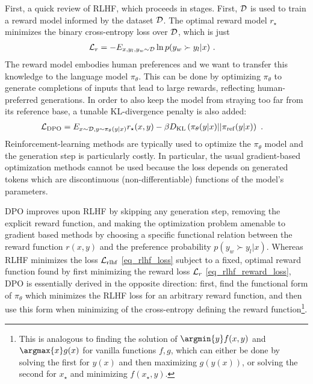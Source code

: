 First, a quick review of RLHF, which proceeds in stages. First, $ \mathcal{D} $ is used to train a reward
model informed by the dataset $ \mathcal{D} $. The optimal reward model $ r_{ \star } $ minimizes the
binary cross-entropy loss over $ \mathcal{D} $, which is just
\begin{align}
  \mathcal{L} _{ r }   &= -E _{ x, y _{ l }, y _{ w } \sim \mathcal{D} } \ln p(y _{ w } \succ y _{ l }| x ) \ . \label{eq_rlhf_reward_loss}
\end{align}
 The reward model embodies human preferences and we want to
transfer this knowledge to the language model $ \pi _{ \theta } $. This can be done by optimizing $
\pi _{ \theta  } $ to generate completions of inputs that lead to large rewards, reflecting
human-preferred generations. In order to also keep the model from straying too far from its reference base, a tunable
KL-divergence penalty is also added:
\begin{align}
    \mathcal{L} _{ {\rm DPO} }  &= E _{x \sim \mathcal{D}, y \sim \pi _{ \theta  }(y|x) } r _{ \star } (x, y)
    - \beta D _{ {\rm KL} } \left ( \pi  _{ \theta  }(y|x)|| \pi _{{\rm ref}}(y|x) \right ) \ . \label{eq_rlhf_loss}
\end{align}
Reinforcement-learning methods are typically used to optimize the $ \pi _{ \theta  } $ model and the
generation step is particularly costly.  In particular, the usual gradient-based optimization
methods cannot be used because the loss depends on generated tokens which are discontinuous
(non-differentiable) functions of the model's parameters.

DPO improves upon RLHF by skipping any generation step, removing the explicit reward function, and
making the optimization problem amenable to gradient based methods by choosing a specific functional
relation between the reward function $ r(x, y) $ and the preference probability $p(y _{ w } \succ y
_{ l }| x )$. Whereas RLHF minimizes the loss $ \mathcal{L} _{ {\rm rlhf} } $ \eqref{eq_rlhf_loss} subject
to a fixed, optimal reward function found by first minimizing the reward loss $ \mathcal{L} _{ r } $
\eqref{eq_rlhf_reward_loss}, DPO is essentially derived in the opposite direction: first, find the
functional form of $ \pi _{ \theta } $ which minimizes the RLHF loss for an arbitrary reward
function, and then use this form when minimizing of the cross-entropy defining the reward
function\footnote{This is analogous to finding the solution of $\argmin{y}f(x, y)$ and $ \argmax{x}
g(x) $ for vanilla functions $ f, g $, which can either be done by solving the first for $ y(x)
$ and then maximizing $ g(y(x)) $, or solving the second for $ x _{ \star } $ and minimizing $ f(x
_{ \star }, y) $.}.

